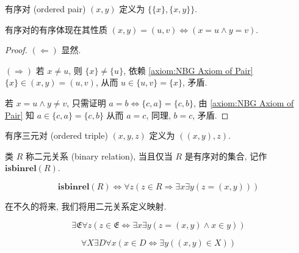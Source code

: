 \begin{definition*}
    \label {definition:Kuratowski ordered pair}
    有序对 (ordered pair) \((x,y)\) 定义为 \(\{\{x\},\{x,y\}\}\).
\end{definition*}

\begin{lemma}
    有序对的有序体现在其性质 \((x,y) = (u,v) \Leftrightarrow (x = u \land y = v)\).

    \begin{proof}
        \((\Leftarrow)\) 显然.

        \((\Rightarrow)\) 若 \(x \neq u\), 则 \(\{x\} \neq \{u\}\), 依赖 \ref{axiom:NBG Axiom of Pair}
        \(\{x\} \in (x,y) = (u,v)\), 从而 \(u \in \{u, v\} = \{x\}\), 矛盾.

        若 \(x = u \land y \neq v\), 只需证明 \(a = b \Leftrightarrow \{c,a\} = \{c,b\}\), 
        由 \ref{axiom:NBG Axiom of Pair} 知 \(a \in \{c,a\} = \{c,b\}\) 从而 \(a = c\), 同理, 
        \(b = c\), 矛盾.
    \end{proof}
\end{lemma}

\begin{definition*}[有序三元对]
    \label {definition:ordered triple}
    有序三元对 (ordered triple) \((x,y,z)\) 定义为 \(((x,y),z)\).
\end{definition*}

\begin{definition*}[二元关系]
    \label {definition:binary relation}
    类 \(R\) 称二元关系 (binary relation), 当且仅当 \(R\) 是有序对的集合, 记作 \(\mathbf{isbinrel} (R)\).

    \[
        \mathbf{isbinrel} (R) \Leftrightarrow \forall z (z \in R \Rightarrow \exists x \exists y (z = (x,y)))
    \]
\end{definition*}

在不久的将来, 我们将用二元关系定义映射.

\begin{axiom*}
    \label {axiom:NBG Axiom of Membership}
    \[
        \exists \mathfrak{E} \forall z (z \in \mathfrak{E} \Leftrightarrow \exists x \exists y (z = (x,y) \land x \in y))
    \]
\end{axiom*}

\begin{axiom*}
    \label {axiom:NBG Axiom of Domain}
    \[
        \forall X \exists D \forall x (x \in D \Leftrightarrow \exists y ((x,y) \in X))
    \]
\end{axiom*}

